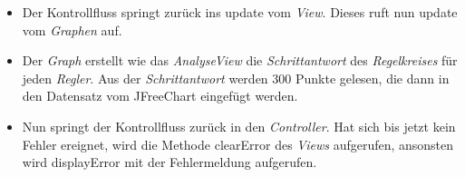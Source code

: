\begin{itemize}
\item Der Kontrollfluss springt zurück ins update vom \textit{View}. Dieses ruft nun update vom \textit{Graphen} auf.\\
\item Der \textit{Graph} erstellt wie das \textit{AnalyseView} die \textit{Schrittantwort} des \textit{Regelkreises} für jeden \textit{Regler}. Aus der \textit{Schrittantwort} werden 300 Punkte gelesen, die dann in den Datensatz vom JFreeChart eingefügt werden.\\
\item Nun springt der Kontrollfluss zurück in den \textit{Controller}. Hat sich bis jetzt kein Fehler ereignet, wird die Methode clearError des \textit{Views} aufgerufen, ansonsten wird displayError mit der Fehlermeldung aufgerufen.
\end{itemize}

